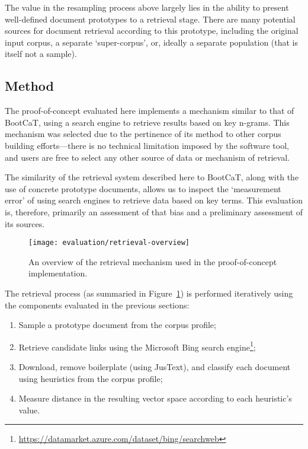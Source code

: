 The value in the resampling process above largely lies in the ability to present well-defined document prototypes to a retrieval stage.  There are many potential sources for document retrieval according to this prototype, including the original input corpus, a separate `super-corpus', or, ideally a separate population (that is itself not a sample).



\subsection{Method}
\label{sec:evaluation:method}

The proof-of-concept evaluated here implements a mechanism similar to that of BootCaT\cite{baroni2004bootcat}, using a search engine to retrieve results based on key n-grams.  This mechanism was selected due to the pertinence of its method to other corpus building efforts---there is no technical limitation imposed by the software tool, and users are free to select any other source of data or mechanism of retrieval.

The similarity of the retrieval system described here to BootCaT, along with the use of concrete prototype documents, allows us to inspect the `measurement error' of using search engines to retrieve data based on key terms.  This evaluation is, therefore, primarily an assessment of that bias and a preliminary assessment of its sources.


\begin{figure}[Ht]
    \centering
    \texttt{[image: evaluation/retrieval-overview]}
    \caption{An overview of the retrieval mechanism used in the proof-of-concept implementation.}
\label{fig:evaluation:retrieval:outline}
\end{figure}


The retrieval process (as summaried in Figure~\ref{fig:evaluation:retrieval:outline}) is performed iteratively using the components evaluated in the previous sections:

\begin{enumerate}
    \item Sample a prototype document from the corpus profile;
    \item Retrieve candidate links using the Microsoft Bing search engine\footnote{\url{https://datamarket.azure.com/dataset/bing/searchweb}};
    \item Download, remove boilerplate (using JusText\cite{pomikalek2013justext}), and classify each document using heuristics from the corpus profile;
    \item Measure distance in the resulting vector space according to each heuristic's value.
\end{enumerate}

